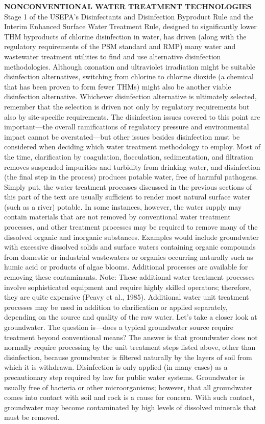 \textbf{NONCONVENTIONAL WATER TREATMENT TECHNOLOGIES}
Stage 1 of the USEPA’s Disinfectants and Disinfection Byproduct Rule and the Interim Enhanced Surface Water Treatment Rule, designed to significantly lower THM byproducts of chlorine disinfection in water, has driven (along with the regulatory requirements of the PSM standard and RMP) many water and wastewater treatment utilities to find and use alternative disinfection methodologies. Although ozonation and ultraviolet irradiation might be suitable disinfection alternatives, switching from chlorine to chlorine dioxide (a chemical that has been proven to form fewer THMs) might also be another viable disinfection alternative. Whichever disinfection alternative is ultimately selected, remember that the selection is driven not only by regulatory requirements but also by site-specific requirements.
The disinfection issues covered to this point are important—the overall ramifications of regulatory pressure and environmental impact cannot be overstated—but other issues besides disinfection must be considered when deciding which water treatment methodology to employ. Most of the time, clarification by coagulation, flocculation, sedimentation, and filtration removes suspended impurities and turbidity from drinking water, and disinfection (the final step in the process) produces potable water, free of harmful pathogens. Simply put, the water treatment processes discussed in the previous sections of this part of the text are usually sufficient to render most natural surface water (such as a river) potable. In some instances, however, the water supply may contain materials that are not removed by conventional water treatment processes, and other treatment processes may be required to remove many of the dissolved organic and inorganic substances. Examples would include groundwater with excessive dissolved solids and surface waters containing organic compounds from domestic or industrial wastewaters or organics occurring naturally such as humic acid or products of algae blooms. Additional processes are available for removing these contaminants.
Note: These additional water treatment processes involve sophisticated equipment and require highly skilled operators; therefore, they are quite expensive (Peavy et al., 1985).
Additional water unit treatment processes may be used in addition to clarification or applied separately, depending on the source and quality of the raw water. Let’s take a closer look at groundwater. The question is—does a typical groundwater source require treatment beyond conventional means? The answer is that groundwater does not normally require processing by the unit treatment steps listed above, other than disinfection, because groundwater is filtered naturally by the layers of soil from which it is withdrawn. Disinfection is only applied (in many cases) as a precautionary step required by law for public water systems. Groundwater is usually free
of bacteria or other microorganisms; however, that all groundwater comes into contact with soil and rock is a cause for concern. With such contact, groundwater may become contaminated by high levels of dissolved minerals that must be removed.

